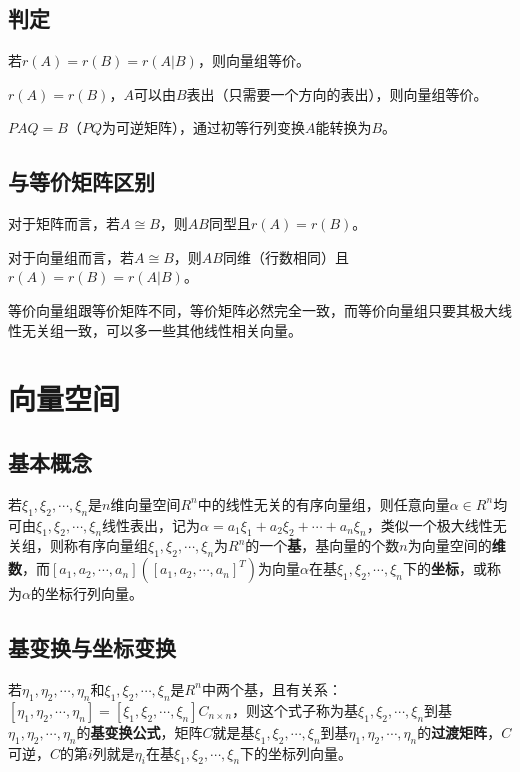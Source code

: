 \documentclass[UTF8, 12pt]{ctexart}
\begin{document}
\subsection{判定}

若$r(A)=r(B)=r(A|B)$，则向量组等价。

$r(A)=r(B)$，$A$可以由$B$表出（只需要一个方向的表出），则向量组等价。

$PAQ=B$（$PQ$为可逆矩阵），通过初等行列变换$A$能转换为$B$。

\subsection{与等价矩阵区别}

对于矩阵而言，若$A\cong B$，则$AB$同型且$r(A)=r(B)$。

对于向量组而言，若$A\cong B$，则$AB$同维（行数相同）且$r(A)=r(B)=r(A|B)$。

等价向量组跟等价矩阵不同，等价矩阵必然完全一致，而等价向量组只要其极大线性无关组一致，可以多一些其他线性相关向量。

\section{向量空间}

\subsection{基本概念}

若$\xi_1,\xi_2,\cdots,\xi_n$是$n$维向量空间$R^n$中的线性无关的有序向量组，则任意向量$\alpha\in R^n$均可由$\xi_1,\xi_2,\cdots,\xi_n$线性表出，记为$\alpha=a_1\xi_1+a_2\xi_2+\cdots+a_n\xi_n$，类似一个极大线性无关组，则称有序向量组$\xi_1,\xi_2,\cdots,\xi_n$为$R^n$的一个\textbf{基}，基向量的个数$n$为向量空间的\textbf{维数}，而$[a_1,a_2,\cdots,a_n]([a_1,a_2,\cdots,a_n]^T)$为向量$\alpha$在基$\xi_1,\xi_2,\cdots,\xi_n$下的\textbf{坐标}，或称为$\alpha$的坐标行列向量。

\subsection{基变换与坐标变换}

若$\eta_1,\eta_2,\cdots,\eta_n$和$\xi_1,\xi_2,\cdots,\xi_n$是$R^n$中两个基，且有关系：$[\eta_1,\eta_2,\cdots,\eta_n]=[\xi_1,\xi_2,\cdots,\xi_n]C_{n\times n}$，则这个式子称为基$\xi_1,\xi_2,\cdots,\xi_n$到基$\eta_1,\eta_2,\cdots,\eta_n$的\textbf{基变换公式}，矩阵$C$就是基$\xi_1,\xi_2,\cdots,\xi_n$到基$\eta_1,\eta_2,\cdots,\eta_n$的\textbf{过渡矩阵}，$C$可逆，$C$的第$i$列就是$\eta_i$在基$\xi_1,\xi_2,\cdots,\xi_n$下的坐标列向量。
\end{document}
